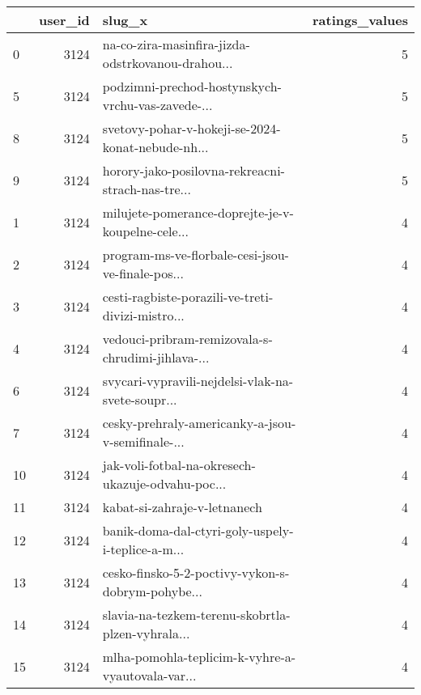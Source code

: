 \begin{tabular}{lrlr}
\toprule
{} &  user\_id &                                             slug\_x &  ratings\_values \\
\midrule
0  &     3124 &  na-co-zira-masinfira-jizda-odstrkovanou-drahou... &               5 \\
5  &     3124 &  podzimni-prechod-hostynskych-vrchu-vas-zavede-... &               5 \\
8  &     3124 &  svetovy-pohar-v-hokeji-se-2024-konat-nebude-nh... &               5 \\
9  &     3124 &  horory-jako-posilovna-rekreacni-strach-nas-tre... &               5 \\
1  &     3124 &  milujete-pomerance-doprejte-je-v-koupelne-cele... &               4 \\
2  &     3124 &  program-ms-ve-florbale-cesi-jsou-ve-finale-pos... &               4 \\
3  &     3124 &  cesti-ragbiste-porazili-ve-treti-divizi-mistro... &               4 \\
4  &     3124 &  vedouci-pribram-remizovala-s-chrudimi-jihlava-... &               4 \\
6  &     3124 &  svycari-vypravili-nejdelsi-vlak-na-svete-soupr... &               4 \\
7  &     3124 &  cesky-prehraly-americanky-a-jsou-v-semifinale-... &               4 \\
10 &     3124 &  jak-voli-fotbal-na-okresech-ukazuje-odvahu-poc... &               4 \\
11 &     3124 &                       kabat-si-zahraje-v-letnanech &               4 \\
12 &     3124 &  banik-doma-dal-ctyri-goly-uspely-i-teplice-a-m... &               4 \\
13 &     3124 &  cesko-finsko-5-2-poctivy-vykon-s-dobrym-pohybe... &               4 \\
14 &     3124 &  slavia-na-tezkem-terenu-skobrtla-plzen-vyhrala... &               4 \\
15 &     3124 &  mlha-pomohla-teplicim-k-vyhre-a-vyautovala-var... &               4 \\
\bottomrule
\end{tabular}
